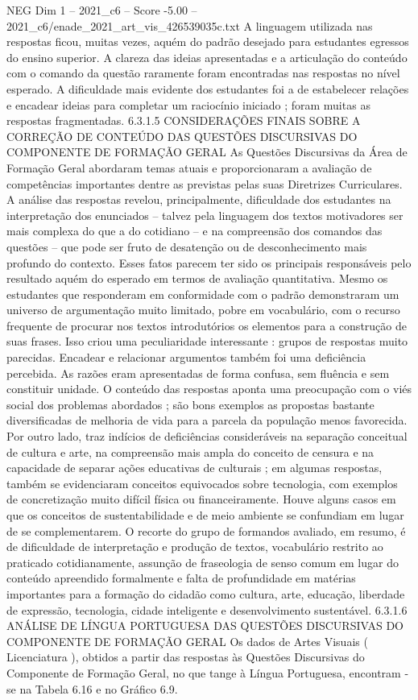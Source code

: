 \begin{textsample}{NEG Dim 1 – 2021\_c6 – Score -5.00 – 2021\_c6/enade\_2021\_art\_vis\_426539035c.txt}
A linguagem utilizada nas respostas ficou, muitas vezes, aquém do padrão desejado para estudantes egressos do ensino superior.
A clareza das ideias apresentadas e a articulação do conteúdo com o comando da questão raramente foram encontradas nas respostas no nível esperado.
A dificuldade mais evidente dos estudantes foi a de estabelecer relações e encadear ideias para completar um raciocínio iniciado ; foram muitas as respostas fragmentadas. 6.3.1.5 CONSIDERAÇÕES FINAIS SOBRE A CORREÇÃO DE CONTEÚDO DAS QUESTÕES DISCURSIVAS DO COMPONENTE DE FORMAÇÃO GERAL As Questões Discursivas da Área de Formação Geral abordaram temas atuais e proporcionaram a avaliação de competências importantes dentre as previstas pelas suas Diretrizes Curriculares.
A análise das respostas revelou, principalmente, dificuldade dos estudantes na interpretação dos enunciados – talvez pela linguagem dos textos motivadores ser mais complexa do que a do cotidiano – e na compreensão dos comandos das questões – que pode ser fruto de desatenção ou de desconhecimento mais profundo do contexto.
Esses fatos parecem ter sido os principais responsáveis pelo resultado aquém do esperado em termos de avaliação quantitativa.
Mesmo os estudantes que responderam em conformidade com o padrão demonstraram um universo de argumentação muito limitado, pobre em vocabulário, com o recurso frequente de procurar nos textos introdutórios os elementos para a construção de suas frases.
Isso criou uma peculiaridade interessante : grupos de respostas muito parecidas.
Encadear e relacionar argumentos também foi uma deficiência percebida.
As razões eram apresentadas de forma confusa, sem fluência e sem constituir unidade.
O conteúdo das respostas aponta uma preocupação com o viés social dos problemas abordados ; são bons exemplos as propostas bastante diversificadas de melhoria de vida para a parcela da população menos favorecida.
Por outro lado, traz indícios de deficiências consideráveis na separação conceitual de cultura e arte, na compreensão mais ampla do conceito de censura e na capacidade de separar ações educativas de culturais ; em algumas respostas, também se evidenciaram conceitos equivocados sobre tecnologia, com exemplos de concretização muito difícil física ou financeiramente.
Houve alguns casos em que os conceitos de sustentabilidade e de meio ambiente se confundiam em lugar de se complementarem.
O recorte do grupo de formandos avaliado, em resumo, é de dificuldade de interpretação e produção de textos, vocabulário restrito ao praticado cotidianamente, assunção de fraseologia de senso comum em lugar do conteúdo apreendido formalmente e falta de profundidade em matérias importantes para a formação do cidadão como cultura, arte, educação, liberdade de expressão, tecnologia, cidade inteligente e desenvolvimento sustentável. 6.3.1.6 ANÁLISE DE LÍNGUA PORTUGUESA DAS QUESTÕES DISCURSIVAS DO COMPONENTE DE FORMAÇÃO GERAL Os dados de Artes Visuais ( Licenciatura ), obtidos a partir das respostas às Questões Discursivas do Componente de Formação Geral, no que tange à Língua Portuguesa, encontram -se na Tabela 6.16 e no Gráfico 6.9.

\end{textsample}
